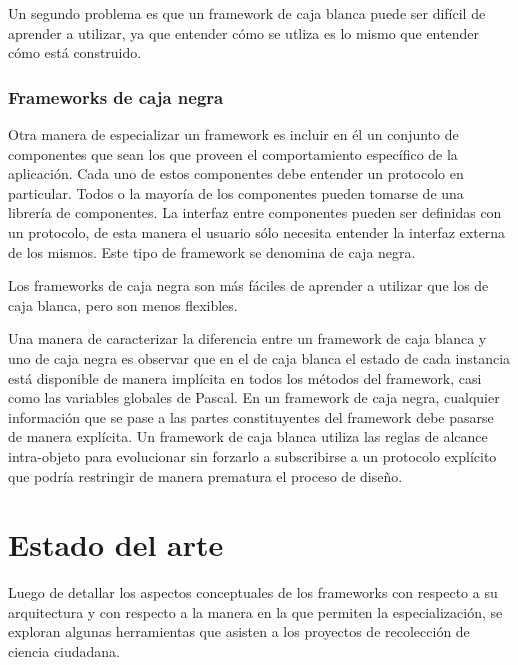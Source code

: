 	Un segundo problema es que un framework de caja blanca puede ser difícil de aprender a utilizar, ya que entender cómo se utliza es lo mismo que entender cómo está construido.\cite{johnson1988designing}
	
\subsubsection{Frameworks de caja negra}

	Otra manera de especializar un framework es incluir en él un conjunto de componentes que sean los que proveen el comportamiento específico de la aplicación. Cada uno de estos componentes debe entender un protocolo en particular. Todos o la mayoría de los componentes pueden tomarse de una librería de componentes. La interfaz entre componentes pueden ser definidas con un protocolo, de esta manera el usuario sólo necesita entender la interfaz externa de los mismos. Este tipo de framework se denomina de caja negra.
	
	Los frameworks de caja negra son más fáciles de aprender a utilizar que los de caja blanca, pero son menos flexibles. 
	
	Una manera de caracterizar la diferencia entre un framework de caja blanca y uno de caja negra es observar que en el de caja blanca el estado de cada instancia está disponible de manera implícita en todos los métodos del framework, casi como las variables globales de Pascal. En un framework de caja negra, cualquier información que se pase a las partes constituyentes del framework debe pasarse de manera explícita. Un framework de caja blanca utiliza las reglas de alcance intra-objeto para evolucionar sin forzarlo a subscribirse a un protocolo explícito que podría restringir de manera prematura el proceso de diseño.
 \cite{johnson1988designing}


\section{Estado del arte} \label{sec:estado_arte}
Luego de detallar los aspectos conceptuales de los frameworks con respecto a su arquitectura y con respecto a la manera en la que permiten la especialización, se exploran algunas herramientas que asisten a los proyectos de recolección de ciencia ciudadana. 

